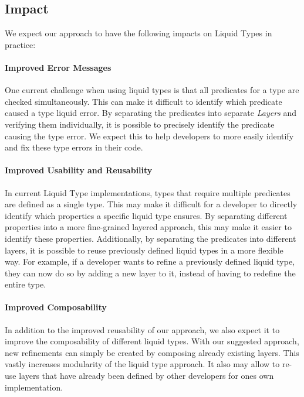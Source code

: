 \documentclass[acmsmall, review, screen]{acmart}
\begin{document}
\subsection{Impact}

We expect our approach to have the following impacts on Liquid Types in practice:

\paragraph{Improved Error Messages}

One current challenge when using liquid types is that all predicates for a type are checked simultaneously. This can make it difficult to identify which predicate caused a type liquid error. By separating the predicates into separate \textit{Layers} and verifying them individually, it is possible to precisely identify the predicate causing the type error. We expect this to help developers to more easily identify and fix these type errors in their code.

\paragraph{Improved Usability and Reusability}

In current Liquid Type implementations, types that require multiple predicates are defined as a single type. This may make it difficult for a developer to directly identify which properties a specific liquid type ensures. By separating different properties into a more fine-grained layered approach, this may make it easier to identify these properties. Additionally, by separating the predicates into different layers, it is possible to reuse previously defined liquid types in a more flexible way. For example, if a developer wants to refine a previously defined liquid type, they can now do so by adding a new layer to it, instead of having to redefine the entire type.

\paragraph{Improved Composability}

In addition to the improved reusability of our approach, we also expect it to improve the composability of different liquid types. With our suggested approach, new refinements can simply be created by composing already existing layers. This vastly increases modularity of the liquid type approach. It also may allow to re-use layers that have already been defined by other developers for ones own implementation.
\end{document}
